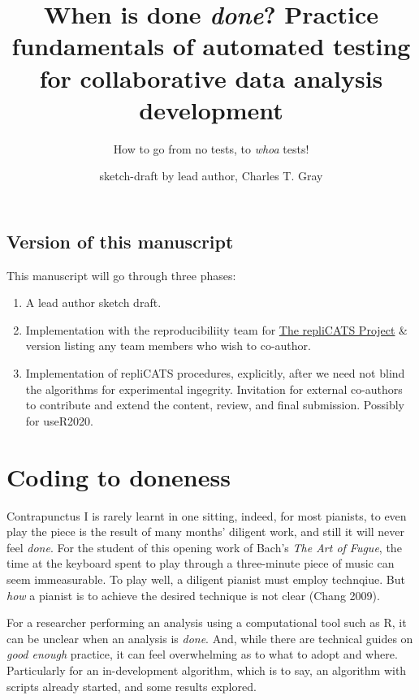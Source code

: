 \documentclass[
]{article}
\title{When is done \emph{done}? Practice fundamentals of automated
testing for collaborative data analysis development}
\subtitle{How to go from no tests, to \emph{whoa} tests!}
\author{sketch-draft by lead author, Charles T. Gray}
\date{}
\providecommand{\tightlist}{%
  \setlength{\itemsep}{0pt}\setlength{\parskip}{0pt}}
\begin{document}
\maketitle

\hypertarget{version-of-this-manuscript}{%
\subsection{Version of this
manuscript}\label{version-of-this-manuscript}}

This manuscript will go through three phases:

\begin{enumerate}
\def\labelenumi{\arabic{enumi}.}
\tightlist
\item
  A lead author sketch draft.
\item
  Implementation with the reproducibiliity team for
  \href{https://replicats.research.unimelb.edu.au/}{The repliCATS
  Project} \& version listing any team members who wish to co-author.
\item
  Implementation of repliCATS procedures, explicitly, after we need not
  blind the algorithms for experimental ingegrity. Invitation for
  external co-authors to contribute and extend the content, review, and
  final submission. Possibly for useR2020.
\end{enumerate}

\hypertarget{coding-to-doneness}{%
\section{Coding to doneness}\label{coding-to-doneness}}

Contrapunctus I is rarely learnt in one sitting, indeed, for most
pianists, to even play the piece is the result of many months' diligent
work, and still it will never feel \emph{done}. For the student of this
opening work of Bach's \emph{The Art of Fugue}, the time at the keyboard
spent to play through a three-minute piece of music can seem
immeasurable. To play well, a diligent pianist must employ technqiue.
But \emph{how} a pianist is to achieve the desired technique is not
clear (Chang 2009).

For a researcher performing an analysis using a computational tool such
as R, it can be unclear when an analysis is \emph{done}. And, while
there are technical guides on \emph{good enough} practice, it can feel
overwhelming as to what to adopt and where. Particularly for an
in-development algorithm, which is to say, an algorithm with scripts
already started, and some results explored.
\end{document}
